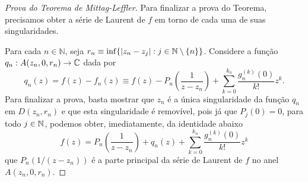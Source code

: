 \begin{proof}[Prova do Teorema de Mittag-Leffler]
    Para finalizar a prova do Teorema,
    precisamos obter a série de Laurent de $f$ 
    em torno de cada uma de suas singularidades.
    
    Para cada $n\in\mathbb{N}$, seja 
    $r_n \equiv \inf\{ |z_n-z_j|: j\in\mathbb{N}\setminus\{n\}\}$. 
    Considere a função $q_n:A(z_n,0,r_n)\to\mathbb{C}$ dada por
    \[
    q_n(z) = f(z)-f_n(z) \equiv 
    f(z)- P_n\left(\frac{1}{z-z_n}\right) +
    \sum_{k=0}^{k_n} \frac{g_{n}^{(k)}(0)}{k!}z^k.
    \]
    Para finalizar a prova, basta mostrar 
    que $z_n$ é a única singularidade
    da função $q_n$ em $D(z_n,r_n)$ 
    e que esta singularidade 
    é removível, pois já
    que $P_j(0)=0$, para todo $j\in\mathbb{N}$,
    podemos obter, imediatamente, da identidade abaixo
    \[
    f(z) = P_n\left(\frac{1}{z-z_n}\right) + q_n(z)+
    \sum_{k=0}^{k_n} \frac{g_{n}^{(k)}(0)}{k!}z^k
    \]
    que $P_n(1/(z-z_n))$ é a parte principal da 
    série de Laurent de $f$ no anel $A(z_n,0,r_n)$.
    

\end{proof}
